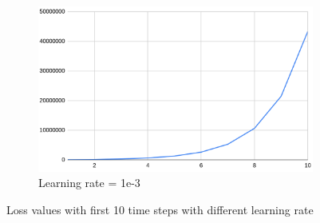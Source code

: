 \documentclass{article}
\begin{document}
\begin{figure}[H]
\begin{subfigure}{0.4\textwidth}
    \includegraphics[width=\linewidth]{lr1e3.png}
    \caption{Learning rate = 1e-3}
\end{subfigure}
\caption{Loss values with first 10 time steps with different learning rate}
\label{fig:lrs}
\end{figure}
\end{document}
